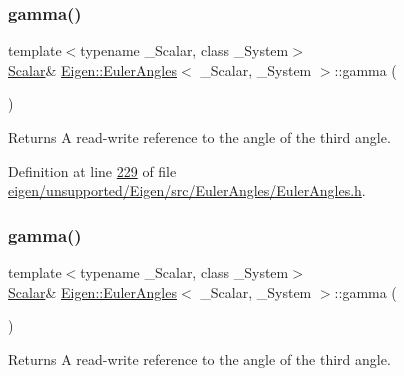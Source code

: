 \subsubsection{\texorpdfstring{gamma()}{gamma()}\hspace{0.1cm}{\footnotesize\ttfamily [3/4]}}
{\footnotesize\ttfamily template$<$typename \+\_\+\+Scalar, class \+\_\+\+System$>$ \\
\hyperlink{class_eigen_1_1_euler_angles_a2ab1d433ac9683268446f8905ac31aac}{Scalar}\& \hyperlink{class_eigen_1_1_euler_angles}{Eigen\+::\+Euler\+Angles}$<$ \+\_\+\+Scalar, \+\_\+\+System $>$\+::gamma (\begin{DoxyParamCaption}{ }\end{DoxyParamCaption})\hspace{0.3cm}{\ttfamily [inline]}}

\begin{DoxyReturn}{Returns}
A read-\/write reference to the angle of the third angle. 
\end{DoxyReturn}


Definition at line \hyperlink{eigen_2unsupported_2_eigen_2src_2_euler_angles_2_euler_angles_8h_source_l00229}{229} of file \hyperlink{eigen_2unsupported_2_eigen_2src_2_euler_angles_2_euler_angles_8h_source}{eigen/unsupported/\+Eigen/src/\+Euler\+Angles/\+Euler\+Angles.\+h}.

\mbox{\label{class_eigen_1_1_euler_angles_a4c6216fa2fca4d5d70d8f44dae4cf88c}} 
\subsubsection{\texorpdfstring{gamma()}{gamma()}\hspace{0.1cm}{\footnotesize\ttfamily [4/4]}}
{\footnotesize\ttfamily template$<$typename \+\_\+\+Scalar, class \+\_\+\+System$>$ \\
\hyperlink{class_eigen_1_1_euler_angles_a2ab1d433ac9683268446f8905ac31aac}{Scalar}\& \hyperlink{class_eigen_1_1_euler_angles}{Eigen\+::\+Euler\+Angles}$<$ \+\_\+\+Scalar, \+\_\+\+System $>$\+::gamma (\begin{DoxyParamCaption}{ }\end{DoxyParamCaption})\hspace{0.3cm}{\ttfamily [inline]}}

\begin{DoxyReturn}{Returns}
A read-\/write reference to the angle of the third angle. 
\end{DoxyReturn}


